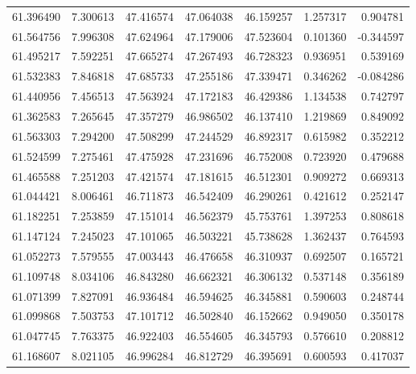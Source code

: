 \begin{tabular}{rrrrrrr}
 61.396490 &   7.300613 &         47.416574 &         47.064038 &         46.159257 &  1.257317 &  0.904781 \\
 61.564756 &   7.996308 &         47.624964 &         47.179006 &         47.523604 &  0.101360 & -0.344597 \\
 61.495217 &   7.592251 &         47.665274 &         47.267493 &         46.728323 &  0.936951 &  0.539169 \\
 61.532383 &   7.846818 &         47.685733 &         47.255186 &         47.339471 &  0.346262 & -0.084286 \\
 61.440956 &   7.456513 &         47.563924 &         47.172183 &         46.429386 &  1.134538 &  0.742797 \\
 61.362583 &   7.265645 &         47.357279 &         46.986502 &         46.137410 &  1.219869 &  0.849092 \\
 61.563303 &   7.294200 &         47.508299 &         47.244529 &         46.892317 &  0.615982 &  0.352212 \\
 61.524599 &   7.275461 &         47.475928 &         47.231696 &         46.752008 &  0.723920 &  0.479688 \\
 61.465588 &   7.251203 &         47.421574 &         47.181615 &         46.512301 &  0.909272 &  0.669313 \\
 61.044421 &   8.006461 &         46.711873 &         46.542409 &         46.290261 &  0.421612 &  0.252147 \\
 61.182251 &   7.253859 &         47.151014 &         46.562379 &         45.753761 &  1.397253 &  0.808618 \\
 61.147124 &   7.245023 &         47.101065 &         46.503221 &         45.738628 &  1.362437 &  0.764593 \\
 61.052273 &   7.579555 &         47.003443 &         46.476658 &         46.310937 &  0.692507 &  0.165721 \\
 61.109748 &   8.034106 &         46.843280 &         46.662321 &         46.306132 &  0.537148 &  0.356189 \\
 61.071399 &   7.827091 &         46.936484 &         46.594625 &         46.345881 &  0.590603 &  0.248744 \\
 61.099868 &   7.503753 &         47.101712 &         46.502840 &         46.152662 &  0.949050 &  0.350178 \\
 61.047745 &   7.763375 &         46.922403 &         46.554605 &         46.345793 &  0.576610 &  0.208812 \\
 61.168607 &   8.021105 &         46.996284 &         46.812729 &         46.395691 &  0.600593 &  0.417037 \\

\end{tabular}
